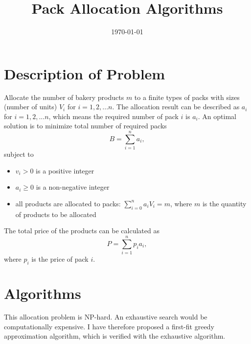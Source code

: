 \documentclass[a4paper]{article}
\begin{document}
\title{\Huge Pack Allocation Algorithms}


\date{\today}


\maketitle

\label{firstpage}
\section{Description of Problem}

Allocate the number of bakery products $m$ to a finite types of packs with sizes
(number of units) $V_i$ for $i=1, 2, ... n$. The allocation result can be described as $a_i$ for $i=1, 2, ... n$, which means the required number of pack $i$ is $a_i$.  An optimal solution is to minimize total number of required packs
$$B = \sum_{i=1}^n a_i,$$
subject to
\begin{itemize}
   \item $v_i > 0$ is a positive integer
   \item $a_i \geq 0$ is a non-negative integer
   \item all products are allocated to packs: $\sum_{i=0}^n a_i V_i = m$, where $m$ is the quantity of products to be allocated
\end{itemize}
The total price of the products can be calculated as
$$P = \sum_{i=1}^n p_i a_i,$$ where $p_i$ is the price of pack $i$.
\section{Algorithms}
This allocation problem is NP-hard. An exhaustive search would be computationally expensive. I have therefore proposed a first-fit greedy approximation algorithm, which is verified with the exhaustive algorithm.
\end{document}
